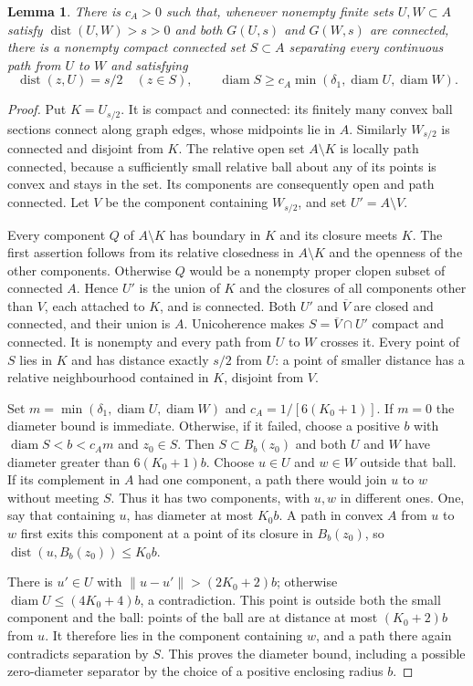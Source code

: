 \documentclass[11pt]{article}
\newtheorem{lemma}[theorem]{Lemma}
\theoremstyle{remark}
\newcommand{\dist}{\operatorname{dist}}
\newcommand{\diam}{\operatorname{diam}}
\begin{document}
\begin{lemma}\label{lem:separator}
There is $c_A>0$ such that, whenever nonempty finite sets $U,W\subset A$
satisfy $\dist(U,W)>s>0$ and both $G(U,s)$ and $G(W,s)$ are connected,
there is a nonempty compact connected set $S\subset A$ separating every
continuous path from $U$ to $W$ and satisfying
\[
 \dist(z,U)=s/2\quad(z\in S),\qquad
 \diam S\geq c_A\min(\delta_1,\diam U,\diam W).
\]
\end{lemma}
\begin{proof}
Put $K=U_{s/2}$. It is compact and connected: its finitely many convex ball
sections connect along graph edges, whose midpoints lie in $A$.
Similarly $W_{s/2}$ is connected and disjoint from $K$.
The relative open set $A\setminus K$ is locally path connected, because a
sufficiently small relative ball about any of its points is convex and stays
in the set. Its components are consequently open and path connected.
Let $V$ be the component containing $W_{s/2}$, and set $U'=A\setminus V$.

Every component $Q$ of $A\setminus K$ has boundary in $K$ and its closure
meets $K$. The first assertion follows from its relative closedness in
$A\setminus K$ and the openness of the other components. Otherwise $Q$
would be a nonempty proper clopen subset of connected $A$.
Hence $U'$ is the union of $K$ and the closures of all components other
than $V$, each attached to $K$, and is connected. Both $U'$ and
$\overline V$ are closed and connected, and their union is $A$.
Unicoherence makes $S=\overline V\cap U'$ compact and connected.
It is nonempty and every path from $U$ to $W$ crosses it. Every point of
$S$ lies in $K$ and has distance exactly $s/2$ from $U$: a point of smaller
distance has a relative neighbourhood contained in $K$, disjoint from $V$.

Set $m=\min(\delta_1,\diam U,\diam W)$ and
$c_A=1/[6(K_0+1)]$. If $m=0$ the diameter bound is immediate.
Otherwise, if it failed, choose a positive $b$ with
$\diam S<b<c_A m$ and $z_0\in S$. Then $S\subset B_b(z_0)$ and both
$U$ and $W$ have diameter greater than $6(K_0+1)b$.
Choose $u\in U$ and $w\in W$ outside that ball. If its complement in $A$
had one component, a path there would join $u$ to $w$ without meeting $S$.
Thus it has two components, with $u,w$ in different ones.
One, say that containing $u$, has diameter at most $K_0b$.
A path in convex $A$ from $u$ to $w$ first exits this component at a point
of its closure in $B_b(z_0)$, so $\dist(u,B_b(z_0))\leq K_0b$.

There is $u'\in U$ with $\|u-u'\|>(2K_0+2)b$; otherwise
$\diam U\leq(4K_0+4)b$, a contradiction. This point is outside both the
small component and the ball: points of the ball are at distance at most
$(K_0+2)b$ from $u$. It therefore lies in the component containing $w$,
and a path there again contradicts separation by $S$. This proves the
diameter bound, including a possible zero-diameter separator by the choice
of a positive enclosing radius $b$.
\end{proof}
\end{document}
